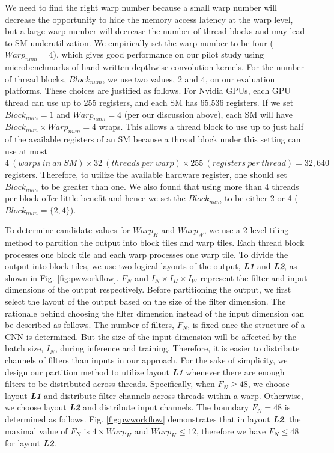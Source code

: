We need to find the right warp number because a small
warp number will decrease the opportunity to hide the memory access latency at the warp level, but a large warp number will decrease the
number of thread blocks and may lead to SM underutilization. We empirically set the warp number to be four ($Warp_{num}=4$), which gives good performance on
our pilot study using microbenchmarks of hand-written depthwise convolution kernels. For the number of thread blocks, $Block_{num}$, we use
two values, 2 and 4, on our evaluation platforms. These choices are justified as follows. For Nvidia GPUs, each GPU thread can use up to
255 registers, and each SM has 65,536 registers. If we set $Block_{num}=1$ and $Warp_{num}=4$ (per our discussion above), each SM will have $Block_{num} \times Warp_{num}=4$ wraps. This allows a thread block to use up to just half of the available registers of an
SM because a thread block under this setting can use at most $4\ (warps\ in\ an\ SM) \times 32\ (threads\ per\ warp) \times 255\ (registers\ per\ thread)=32,640$ registers. Therefore, to utilize the available hardware register, one should set $Block_{num}$ to be greater than one. We
also found that using more than 4 threads per block offer little benefit and hence we set the $Block_{num}$ to be either 2 or 4 ($Block_{num}=\{2,4\}$).

To determine candidate values for $Warp_H$ and $Warp_W$, we use a 2-level tiling method to partition the output into block tiles and warp tiles. 
Each thread block processes one block tile and each warp processes one warp tile.
To divide the output into block tiles, we use two logical layouts of the output, \textbf{\emph{L1}} and \textbf{\emph{L2}}, as shown in Fig. \ref{fig:pwworkflow}.
$F_N$ and $I_N \times I_H \times I_W$ represent the filter and input dimensions of the output respectively.
Before partitioning the output, we first select the layout of the output based on the size of the filter dimension.
The rationale behind choosing the filter dimension instead of the input dimension can be described as follows.
The number of filters, $F_N$, is fixed once the structure of a CNN is determined.
But the size of the input dimension will be affected by the batch size, $I_N$, during inference and training.
Therefore, it is easier to distribute channels of filters than inputs in our approach.
For the sake of simplicity, we design our partition method to utilize layout \textbf{\emph{L1}} whenever there are enough filters to be distributed across threads.
Specifically, when $F_N \ge 48$, we choose layout \textbf{\emph{L1}} and distribute filter channels across threads within a warp.
Otherwise, we choose layout \textbf{\emph{L2}} and distribute input channels.
The boundary $F_N = 48$ is determined as follows.
Fig. \ref{fig:pwworkflow} demonstrates that in layout \textbf{\emph{L2}}, the maximal value of $F_N$ is $4 \times Warp_H$ and $Warp_H \leq 12$, therefore we have $F_N \leq 48$ for layout \textbf{\emph{L2}}.

